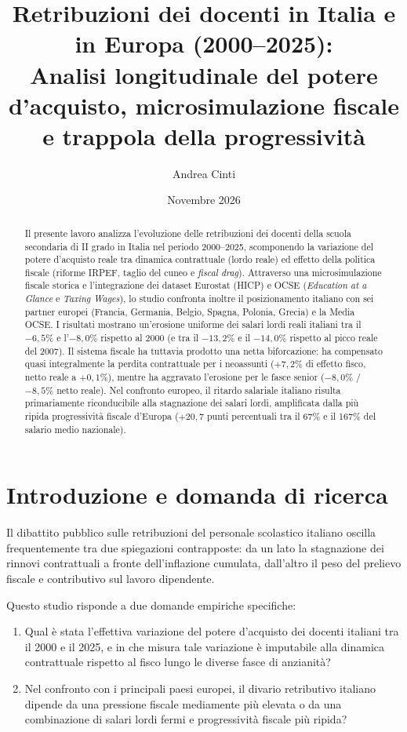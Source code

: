 \documentclass[11pt,a4paper]{article}
\title{\textbf{Retribuzioni dei docenti in Italia e in Europa (2000--2025):}\\
\large Analisi longitudinale del potere d'acquisto, microsimulazione fiscale e trappola della progressività}
\author{Andrea Cinti}
\date{Novembre 2026}
\begin{document}
\maketitle

\begin{abstract}
\noindent Il presente lavoro analizza l'evoluzione delle retribuzioni dei docenti della scuola secondaria di II grado in Italia nel periodo 2000--2025, scomponendo la variazione del potere d'acquisto reale tra dinamica contrattuale (lordo reale) ed effetto della politica fiscale (riforme IRPEF, taglio del cuneo e \textit{fiscal drag}). Attraverso una microsimulazione fiscale storica e l'integrazione dei dataset Eurostat (HICP) e OCSE (\textit{Education at a Glance} e \textit{Taxing Wages}), lo studio confronta inoltre il posizionamento italiano con sei partner europei (Francia, Germania, Belgio, Spagna, Polonia, Grecia) e la Media OCSE. I risultati mostrano un'erosione uniforme dei salari lordi reali italiani tra il $-6{,}5\%$ e l'$-8{,}0\%$ rispetto al 2000 (e tra il $-13{,}2\%$ e il $-14{,}0\%$ rispetto al picco reale del 2007). Il sistema fiscale ha tuttavia prodotto una netta biforcazione: ha compensato quasi integralmente la perdita contrattuale per i neoassunti ($+7{,}2\%$ di effetto fisco, netto reale a $+0{,}1\%$), mentre ha aggravato l'erosione per le fasce senior ($-8{,}0\%$ / $-8{,}5\%$ netto reale). Nel confronto europeo, il ritardo salariale italiano risulta primariamente riconducibile alla stagnazione dei salari lordi, amplificata dalla più ripida progressività fiscale d'Europa ($+20{,}7$ punti percentuali tra il 67\% e il 167\% del salario medio nazionale).
\end{abstract}

\section{Introduzione e domanda di ricerca}
Il dibattito pubblico sulle retribuzioni del personale scolastico italiano oscilla frequentemente tra due spiegazioni contrapposte: da un lato la stagnazione dei rinnovi contrattuali a fronte dell'inflazione cumulata, dall'altro il peso del prelievo fiscale e contributivo sul lavoro dipendente.

Questo studio risponde a due domande empiriche specifiche:
\begin{enumerate}
    \item Qual è stata l'effettiva variazione del potere d'acquisto dei docenti italiani tra il 2000 e il 2025, e in che misura tale variazione è imputabile alla dinamica contrattuale rispetto al fisco lungo le diverse fasce di anzianità?
    \item Nel confronto con i principali paesi europei, il divario retributivo italiano dipende da una pressione fiscale mediamente più elevata o da una combinazione di salari lordi fermi e progressività fiscale più ripida?
\end{enumerate}
\end{document}
